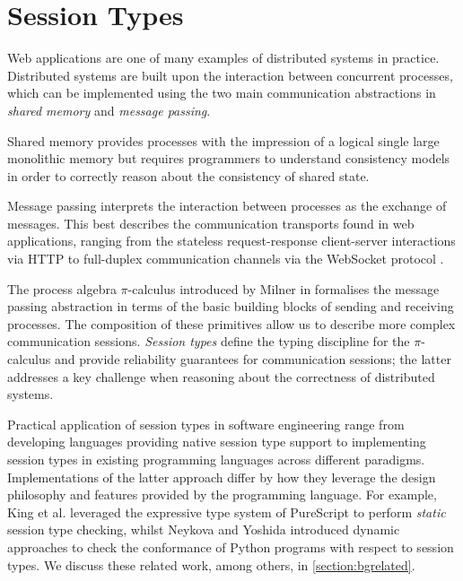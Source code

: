 \section{Session Types}
\label{section:sessiontypes}

Web applications are one of many examples of 
distributed systems in practice. 
Distributed systems are built upon the interaction 
between concurrent processes, which can be implemented using 
the two main communication abstractions in 
\textit{shared memory} and \textit{message passing}. 

Shared memory provides processes with the impression of 
a logical single large monolithic memory 
but requires programmers to understand consistency models 
in order to correctly reason about the consistency of shared state.

Message passing interprets the interaction between processes 
as the exchange of messages.
This best describes the communication transports 
found in web applications, ranging from the 
stateless request-response client-server interactions via HTTP 
to full-duplex communication channels via the WebSocket protocol 
\cite{WebSocketRFC}.

The process algebra $\pi$-calculus 
introduced by Milner in \cite{Milner1999} 
formalises the message passing abstraction in terms of 
the basic building blocks of sending and receiving processes.
The composition of these primitives allow us to 
describe more complex communication sessions.
\textit{Session types} define the typing discipline 
for the $\pi$-calculus and provide reliability guarantees 
for communication sessions; 
the latter addresses a key challenge when 
reasoning about the correctness of distributed systems. 

Practical application of session types in software
engineering range from
developing languages providing native session type support 
\cite{ATS2016} to implementing session types 
in existing programming languages across different paradigms.
Implementations of the latter approach differ by 
how they leverage the design philosophy and features 
provided by the programming language.
For example, King et al. \cite{PureScript2019} leveraged the 
expressive type system of PureScript to perform 
\textit{static} session type checking,
whilst Neykova and Yoshida \cite{Python2017} 
introduced dynamic approaches to 
check the conformance of Python programs 
with respect to session types.
We discuss these related work, among others, in \cref{section:bgrelated}.

